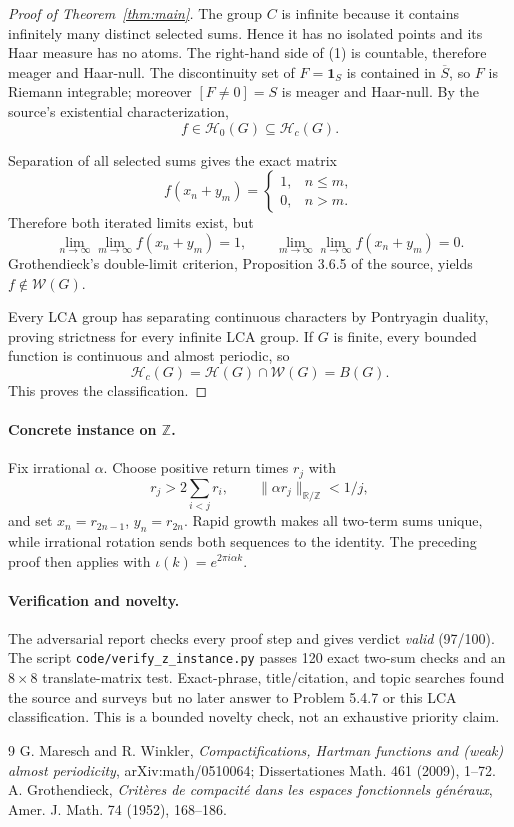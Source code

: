 \documentclass[10pt]{article}
\newcommand{\Hc}{\mathcal H_c}
\newcommand{\Hz}{\mathcal H_0}
\newcommand{\Hh}{\mathcal H}
\newcommand{\W}{\mathcal W}
\begin{document}
\begin{proof}[Proof of Theorem~\ref{thm:main}]
The group $C$ is infinite because it contains infinitely many distinct selected sums. Hence it has no isolated points and its Haar measure has no atoms. The right-hand side of (1) is countable, therefore meager and Haar-null. The discontinuity set of $F=\mathbf1_S$ is contained in $\overline S$, so $F$ is Riemann integrable; moreover $[F\ne0]=S$ is meager and Haar-null. By the source's existential characterization,
\[
 f\in\Hz(G)\subseteq\Hc(G).
\]

Separation of all selected sums gives the exact matrix
\[
 f(x_n+y_m)=\begin{cases}1,&n\le m,\\0,&n>m.\end{cases}
\]
Therefore both iterated limits exist, but
\[
 \lim_{n\to\infty}\lim_{m\to\infty}f(x_n+y_m)=1,
 \qquad
 \lim_{m\to\infty}\lim_{n\to\infty}f(x_n+y_m)=0.
\]
Grothendieck's double-limit criterion, Proposition 3.6.5 of the source, yields $f\notin\W(G)$.

Every LCA group has separating continuous characters by Pontryagin duality, proving strictness for every infinite LCA group. If $G$ is finite, every bounded function is continuous and almost periodic, so
\[
 \Hc(G)=\Hh(G)\cap\W(G)=B(G).
\]
This proves the classification.
\end{proof}

\paragraph{Concrete instance on $\mathbb Z$.}
Fix irrational $\alpha$. Choose positive return times $r_j$ with
\[
 r_j>2\sum_{i<j}r_i,\qquad \|\alpha r_j\|_{\mathbb R/\mathbb Z}<1/j,
\]
and set $x_n=r_{2n-1}$, $y_n=r_{2n}$. Rapid growth makes all two-term sums unique, while irrational rotation sends both sequences to the identity. The preceding proof then applies with $\iota(k)=e^{2\pi i\alpha k}$.

\paragraph{Verification and novelty.}
The adversarial report checks every proof step and gives verdict \emph{valid} (97/100). The script \texttt{code/verify\_z\_instance.py} passes 120 exact two-sum checks and an $8\times8$ translate-matrix test. Exact-phrase, title/citation, and topic searches found the source and surveys but no later answer to Problem 5.4.7 or this LCA classification. This is a bounded novelty check, not an exhaustive priority claim.

\begin{thebibliography}{9}
G. Maresch and R. Winkler,
\emph{Compactifications, Hartman functions and (weak) almost periodicity},
arXiv:math/0510064; Dissertationes Math. 461 (2009), 1--72.
A. Grothendieck,
\emph{Crit\`eres de compacit\'e dans les espaces fonctionnels g\'en\'eraux},
Amer. J. Math. 74 (1952), 168--186.
\end{thebibliography}
\end{document}
